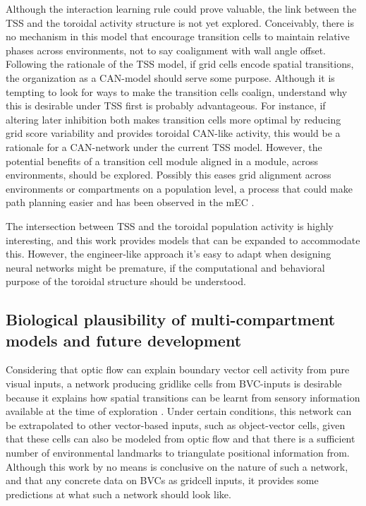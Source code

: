 \documentclass{article}
\begin{document}
    Although the interaction learning rule could prove valuable, the link between the TSS and the toroidal activity structure is not yet explored. Conceivably, there is no mechanism in this model that encourage transition cells to maintain relative phases across environments, not to say coalignment with wall angle offset. Following the rationale of the TSS model, if grid cells encode spatial transitions, the organization as a CAN-model should serve some purpose. Although it is tempting to look for ways to make the transition cells coalign, understand why this is desirable under TSS first is probably advantageous. For instance, if altering later inhibition both makes transition cells more optimal by reducing grid score variability and provides toroidal CAN-like activity, this would be a rationale for a CAN-network under the current TSS model. However, the potential benefits of a transition cell module aligned in a module, across environments, should be explored. Possibly this eases grid alignment across environments or compartments on a population level, a process that could make path planning easier and has been observed in the mEC \parencite{Carpenter2015}.

    The intersection between TSS and the toroidal population activity is highly interesting, and this work provides models that can be expanded to accommodate this. However, the engineer-like approach it's easy to adapt when designing neural networks might be premature, if the computational and behavioral purpose of the toroidal structure should be understood.

    \subsection{Biological plausibility of multi-compartment models and future development} \label{Future: BVCs}

    Considering that optic flow can explain boundary vector cell activity from pure visual inputs, a network producing gridlike cells from BVC-inputs is desirable because it explains how spatial transitions can be learnt from sensory information available at the time of exploration \parencite{Raudies2012}. Under certain conditions, this network can be extrapolated to other vector-based inputs, such as object-vector cells, given that these cells can also be modeled from optic flow and that there is a sufficient number of environmental landmarks to triangulate positional information from. Although this work by no means is conclusive on the nature of such a network, and that any concrete data on BVCs as gridcell inputs, it provides some predictions at what such a network should look like.
\end{document}
